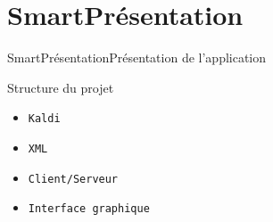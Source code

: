\documentclass[10pt]{beamer}
\begin{document}
\section{SmartPrésentation}
\begin{frame}{SmartPrésentation}{Présentation de l'application}
	\begin{block}{Structure du projet}
	  	\begin{itemize}
	  		\item {\tt Kaldi}
	  		\item {\tt XML}
	  		\item {\tt Client/Serveur}
	  		\item {\tt Interface graphique}	
		\end{itemize}
	\end{block}
\end{frame}
\end{document}
